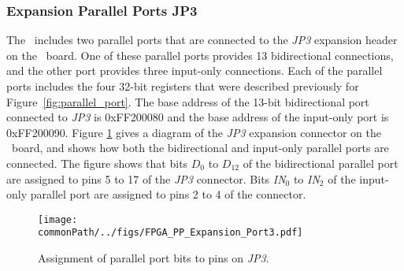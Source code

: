 \subsubsection{Expansion Parallel Ports JP3}

The \systemName~includes two parallel ports that are connected to the
{\it JP3} expansion header on the \DEBoard~board. One of these parallel ports provides 13
bidirectional connections, and the other port provides three input-only connections. 
Each of the parallel ports includes the four 32-bit registers that were described previously for 
Figure~\ref{fig:parallel_port}. The base address of the 13-bit bidirectional port connected to 
{\it JP3} is {\sf 0xFF200080} and the base address of the input-only port is {\sf 0xFF200090}.
Figure \ref{fig:expansion_port_JP3} gives a diagram of the {\it JP3} expansion connector on 
the \DEBoard~board, and shows how both the bidirectional and input-only parallel ports are 
connected.  The figure shows that bits $D_0$ to $D_{12}$ of the bidirectional parallel port 
are assigned to pins 5 to 17 of the {\it JP3} connector. Bits {\it IN}$_0$ to 
{\it IN}$_2$ of the input-only parallel port are assigned to pins 2 to 4 of the connector.

\begin{figure}[h!]
   \begin{center}
       \texttt{[image: \\commonPath/../figs/FPGA\_PP\_Expansion\_Port3.pdf]}
   \end{center}
   \caption{Assignment of parallel port bits to pins on {\it JP3}.}
	\label{fig:expansion_port_JP3}
\end{figure}